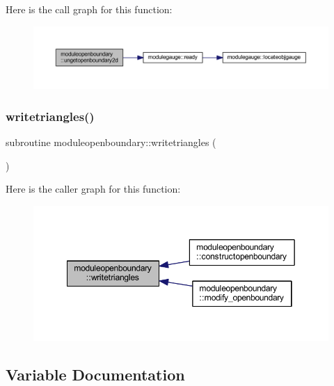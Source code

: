 Here is the call graph for this function\+:\nopagebreak
\begin{figure}[H]
\begin{center}
\leavevmode
\includegraphics[width=350pt]{namespacemoduleopenboundary_a601c9cebbb40986b76e9488a0af4dc3a_cgraph}
\end{center}
\end{figure}
\mbox{\label{namespacemoduleopenboundary_a0f8bf6cd86f964a155b3d7b4c3a54497}} 
\subsubsection{\texorpdfstring{writetriangles()}{writetriangles()}}
{\footnotesize\ttfamily subroutine moduleopenboundary\+::writetriangles (\begin{DoxyParamCaption}{ }\end{DoxyParamCaption})\hspace{0.3cm}{\ttfamily [private]}}

Here is the caller graph for this function\+:\nopagebreak
\begin{figure}[H]
\begin{center}
\leavevmode
\includegraphics[width=349pt]{namespacemoduleopenboundary_a0f8bf6cd86f964a155b3d7b4c3a54497_icgraph}
\end{center}
\end{figure}


\subsection{Variable Documentation}
\mbox{\label{namespacemoduleopenboundary_a34fb62c3d7f54754cad4022cbdadaa4f}} 
